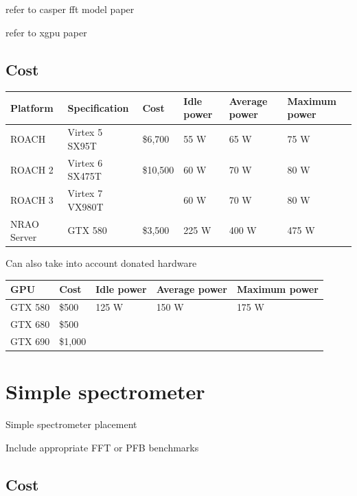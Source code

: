 refer to casper fft model paper

refer to xgpu paper

\subsection{Cost}

\begin{table}
\begin{tabular}{| l | l | l | l | l | l |}
\hline  
\textbf{Platform} & Specification & Cost & Idle power & Average power & Maximum power \\
\hline  
ROACH & Virtex 5 SX95T & \$6,700 & 55 W & 65 W & 75 W \\
ROACH 2 & Virtex 6 SX475T & \$10,500 & 60 W & 70 W & 80 W \\
ROACH 3 & Virtex 7 VX980T & & 60 W & 70 W & 80 W \\
NRAO Server & GTX 580 & \$3,500 & 225 W & 400 W & 475 W \\
\hline  
\end{tabular}
\end{table} 

Can also take into account donated hardware \\

\begin{table}
\begin{tabular}{| l | l | l | l | l |}
\hline  
GPU & Cost & Idle power & Average power & Maximum power \\
\hline  
GTX 580& \$500 & 125 W & 150 W & 175 W \\
GTX 680 & \$500 & & & \\
GTX 690& \$1,000 & & & \\
\hline  
\end{tabular}
\end{table} 



\section{Simple spectrometer}
Simple spectrometer placement

Include appropriate FFT or PFB benchmarks
\subsection{Cost}
